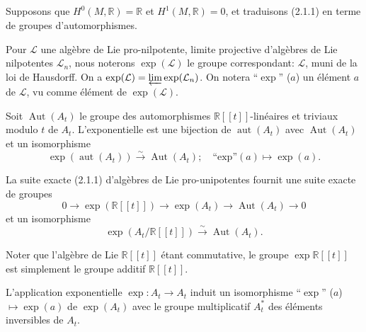 \documentclass[11pt,a4paper]{article}
\theoremstyle{plain}
\theoremstyle{definition}
\DeclareMathOperator{\Aut}{Aut}
\DeclareMathOperator{\aut}{aut}
\newcommand{\R}{\mathbb{R}}
\newcommand{\iso}{\xrightarrow{\sim}}
\begin{document}
\subsection{}
Supposons que $H^{0}(M,\R) = \R$ et $H^{1}(M,\R) = 0$, et traduisons (2.1.1) en terme de groupes d'automorphismes.

Pour $\mathcal{L}$ une alg\`ebre de Lie pro-nilpotente, limite projective d'alg\`ebres de Lie nilpotentes $\mathcal{L}_{n}$, nous noterons $\exp(\mathcal{L})$ le groupe correspondant: $\mathcal{L}$, muni de la loi de Hausdorff. On a $\exp(\mathcal{L}) = \varprojlim \exp(\mathcal{L}_{n})$. On notera ``$\exp$'' ($a$) un \'el\'ement $a$ de $\mathcal{L}$, vu comme \'el\'ement de $\exp(\mathcal{L})$.

Soit $\Aut(A_{t})$ le groupe des automorphismes $\R[[t]]$-lin\'eaires et triviaux modulo $t$ de $A_{t}$. L'exponentielle est une bijection de $\aut(A_{t})$ avec $\Aut(A_{t})$ et un isomorphisme
\[
\exp(\aut(A_{t})) \iso \Aut(A_{t}); \quad \text{``exp''}(a) \longmapsto \exp(a).
\]

La suite exacte (2.1.1) d'alg\`ebres de Lie pro-unipotentes fournit une suite exacte de groupes
\begin{equation}
0 \longrightarrow \exp(\R[[t]]) \longrightarrow \exp(A_{t}) \longrightarrow \Aut(A_{t}) \longrightarrow 0 \tag{2.2.1}
\end{equation}
et un isomorphisme
\begin{equation}
\exp(A_{t}/\R[[t]]) \iso \Aut(A_{t}). \tag{2.2.2}
\end{equation}

Noter que l'alg\`ebre de Lie $\R[[t]]$ \'etant commutative, le groupe $\exp \R[[t]]$ est simplement le groupe additif $\R[[t]]$.

L'application exponentielle $\exp: A_{t} \to A_{t}$ induit un isomorphisme ``$\exp$'' ($a$) $\mapsto \exp(a)$ de $\exp(A_{t})$ avec le groupe multiplicatif $A_{t}^{*}$ des \'el\'ements inversibles de $A_{t}$.
\end{document}
